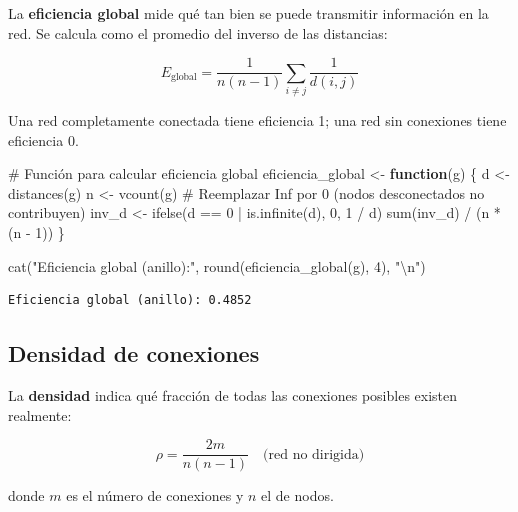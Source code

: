 \documentclass[
  letterpaper,
  DIV=11,
  numbers=noendperiod]{scrreprt}
\newenvironment{Shaded}{\begin{snugshade}}{\end{snugshade}}
\newcommand{\CommentTok}[1]{\textcolor[rgb]{0.37,0.37,0.37}{#1}}
\newcommand{\ControlFlowTok}[1]{\textcolor[rgb]{0.00,0.23,0.31}{\textbf{#1}}}
\newcommand{\DecValTok}[1]{\textcolor[rgb]{0.68,0.00,0.00}{#1}}
\newcommand{\FunctionTok}[1]{\textcolor[rgb]{0.28,0.35,0.67}{#1}}
\newcommand{\NormalTok}[1]{\textcolor[rgb]{0.00,0.23,0.31}{#1}}
\newcommand{\OtherTok}[1]{\textcolor[rgb]{0.00,0.23,0.31}{#1}}
\newcommand{\SpecialCharTok}[1]{\textcolor[rgb]{0.37,0.37,0.37}{#1}}
\newcommand{\StringTok}[1]{\textcolor[rgb]{0.13,0.47,0.30}{#1}}
\begin{document}
La \textbf{eficiencia global} mide qué tan bien se puede transmitir
información en la red. Se calcula como el promedio del inverso de las
distancias:

\[
E_{\text{global}} = \frac{1}{n(n-1)} \sum_{i \neq j} \frac{1}{d(i, j)}
\]

Una red completamente conectada tiene eficiencia 1; una red sin
conexiones tiene eficiencia 0.

\begin{Shaded}
\begin{Highlighting}[]
\CommentTok{\# Función para calcular eficiencia global}
\NormalTok{eficiencia\_global }\OtherTok{\textless{}{-}} \ControlFlowTok{function}\NormalTok{(g) \{}
\NormalTok{  d }\OtherTok{\textless{}{-}} \FunctionTok{distances}\NormalTok{(g)}
\NormalTok{  n }\OtherTok{\textless{}{-}} \FunctionTok{vcount}\NormalTok{(g)}
  \CommentTok{\# Reemplazar Inf por 0 (nodos desconectados no contribuyen)}
\NormalTok{  inv\_d }\OtherTok{\textless{}{-}} \FunctionTok{ifelse}\NormalTok{(d }\SpecialCharTok{==} \DecValTok{0} \SpecialCharTok{|} \FunctionTok{is.infinite}\NormalTok{(d), }\DecValTok{0}\NormalTok{, }\DecValTok{1} \SpecialCharTok{/}\NormalTok{ d)}
  \FunctionTok{sum}\NormalTok{(inv\_d) }\SpecialCharTok{/}\NormalTok{ (n }\SpecialCharTok{*}\NormalTok{ (n }\SpecialCharTok{{-}} \DecValTok{1}\NormalTok{))}
\NormalTok{\}}

\FunctionTok{cat}\NormalTok{(}\StringTok{"Eficiencia global (anillo):"}\NormalTok{, }\FunctionTok{round}\NormalTok{(}\FunctionTok{eficiencia\_global}\NormalTok{(g), }\DecValTok{4}\NormalTok{), }\StringTok{"}\SpecialCharTok{\textbackslash{}n}\StringTok{"}\NormalTok{)}
\end{Highlighting}
\end{Shaded}

\begin{verbatim}
Eficiencia global (anillo): 0.4852 
\end{verbatim}

\subsection{Densidad de conexiones}\label{densidad-de-conexiones}

La \textbf{densidad} indica qué fracción de todas las conexiones
posibles existen realmente:

\[
\rho = \frac{2m}{n(n-1)} \quad \text{(red no dirigida)}
\]

donde \(m\) es el número de conexiones y \(n\) el de nodos.
\end{document}
